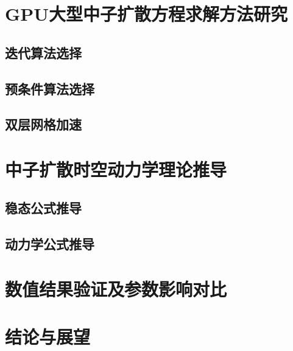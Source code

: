 \documentclass[master,xetex]{thuthesis}
\begin{document}
\chapter{GPU大型中子扩散方程求解方法研究}
\section{迭代算法选择}
\section{预条件算法选择}
\section{双层网格加速}

\chapter{中子扩散时空动力学理论推导}
\section{稳态公式推导}
\section{动力学公式推导}

\chapter{数值结果验证及参数影响对比}



\chapter{结论与展望}


\backmatter







%
\end{document}
